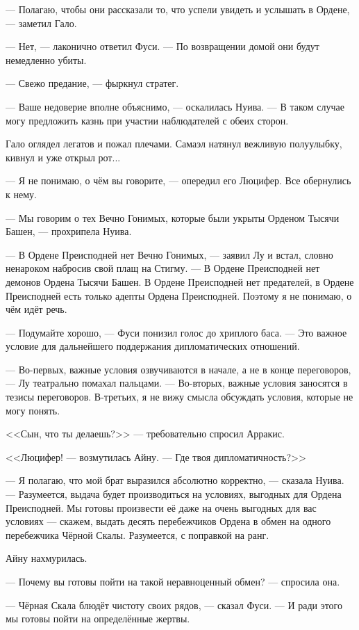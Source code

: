 --- Полагаю, чтобы они рассказали то, что успели увидеть и услышать в Ордене, --- заметил Гало.

--- Нет, --- лаконично ответил Фуси.
--- По возвращении домой они будут немедленно убиты.

--- Свежо предание, --- фыркнул стратег.

--- Ваше недоверие вполне объяснимо, --- оскалилась Нуива.
--- В таком случае могу предложить казнь при участии наблюдателей с обеих сторон.

Гало оглядел легатов и пожал плечами.
Самаэл натянул вежливую полуулыбку, кивнул и уже открыл рот...

--- Я не понимаю, о чём вы говорите, --- опередил его Люцифер.
Все обернулись к нему.

--- Мы говорим о тех Вечно Гонимых, которые были укрыты Орденом Тысячи Башен, --- прохрипела Нуива.

--- В Ордене Преисподней нет Вечно Гонимых, --- заявил Лу и встал, словно ненароком набросив свой плащ на Стигму.
--- В Ордене Преисподней нет демонов Ордена Тысячи Башен.
В Ордене Преисподней нет предателей, в Ордене Преисподней есть только адепты Ордена Преисподней.
Поэтому я не понимаю, о чём идёт речь.

--- Подумайте хорошо, --- Фуси понизил голос до хриплого баса.
--- Это важное условие для дальнейшего поддержания дипломатических отношений.

--- Во-первых, важные условия озвучиваются в начале, а не в конце переговоров, --- Лу театрально помахал пальцами.
--- Во-вторых, важные условия заносятся в тезисы переговоров.
В-третьих, я не вижу смысла обсуждать условия, которые не могу понять.

<<Сын, что ты делаешь?>> --- требовательно спросил Арракис.

<<Люцифер! --- возмутилась Айну.
--- Где твоя дипломатичность?>>

--- Я полагаю, что мой брат выразился абсолютно корректно, --- сказала Нуива.
--- Разумеется, выдача будет производиться на условиях, выгодных для Ордена Преисподней.
Мы готовы произвести её даже на очень выгодных для вас условиях --- скажем, выдать десять перебежчиков Ордена в обмен на одного перебежчика Чёрной Скалы.
Разумеется, с поправкой на ранг.

Айну нахмурилась.

--- Почему вы готовы пойти на такой неравноценный обмен? --- спросила она.

--- Чёрная Скала блюдёт чистоту своих рядов, --- сказал Фуси.
--- И ради этого мы готовы пойти на определённые жертвы.

